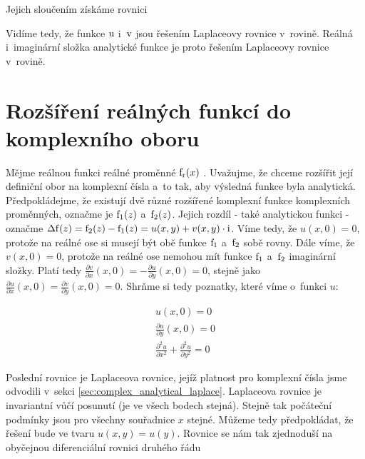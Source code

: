 
Jejich sloučením získáme rovnici


Vidíme tedy, že funkce \(\mathrm{u}\) i~\(\mathrm{v}\) jsou řešením Laplaceovy rovnice v~rovině. Reálná i~imaginární složka analytické funkce je proto řešením Laplaceovy rovnice v~rovině.

\section{Rozšíření reálných funkcí do komplexního oboru}

Mějme reálnou funkci reálné proměnné \(\mathrm{f_r}(x)\) . Uvažujme, že chceme rozšířit její definiční obor na komplexní čísla a~to tak, aby výsledná funkce byla analytická. Předpokládejme, že existují dvě různé rozšířené komplexní funkce komplexních proměnných, označme je \(\mathrm{f_1}(z)\) a~\(\mathrm{f_2}(z)\). Jejich rozdíl - také analytickou funkci - označme \(\mathrm{\Delta f}(z) = \mathrm{f_2}(z) - \mathrm{f_1}(z) = u(x, y) + v(x, y) \cdot \mathrm{i}\). Víme tedy, že \(u(x, 0) = 0\), protože na reálné ose si musejí být obě funkce \(\mathrm{f_1}\) a~\(\mathrm{f_2}\) sobě rovny. Dále víme, že \(v(x, 0) = 0\), protože na reálné ose nemohou mít funkce \(\mathrm{f_1}\) a~\(\mathrm{f_2}\) imaginární složky. Platí tedy \(\frac{\partial v}{\partial x}(x, 0) = -\frac{\partial u}{\partial y}(x, 0) = 0\), stejně jako \(\frac{\partial u}{\partial x}(x, 0) = \frac{\partial v}{\partial y}(x, 0) = 0\). Shrňme si tedy poznatky, které víme o~funkci \(u\):

\begin{equation}
\begin{split}
u(x, 0) = 0 \\
\frac{\partial u}{\partial y}(x, 0) = 0 \\
\frac{\partial^2 u}{\partial x^2} + \frac{\partial^2 u}{\partial y^2} = 0
\end{split}
\end{equation}

Poslední rovnice je Laplaceova rovnice, jejíž platnost pro komplexní čísla jsme odvodili v~sekci \ref{sec:complex_analytical_laplace}. Laplaceova rovnice je invariantní vůčí posunutí (je ve všech bodech stejná). Stejně tak počáteční podmínky jsou pro všechny souřadnice \(x\) stejné. Můžeme tedy předpokládat, že řešení bude ve tvaru \(u(x, y) = u(y)\). Rovnice se nám tak zjednoduší na obyčejnou diferenciální rovnici druhého řádu

